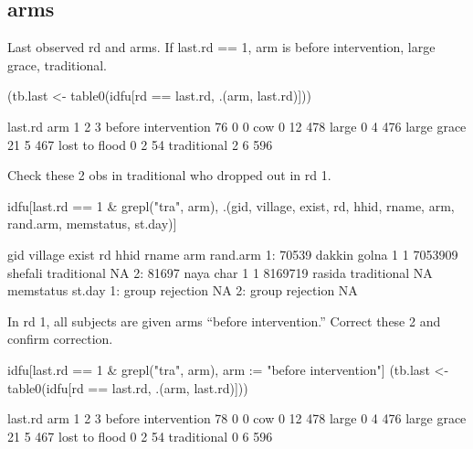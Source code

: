 \subsection{arms}



Last observed rd and arms. If \textsf{last.rd} == 1, arm is before intervention, large grace, traditional. 
\begin{Schunk}
\begin{Sinput}
(tb.last <- table0(idfu[rd == last.rd, .(arm, last.rd)]))
\end{Sinput}
\begin{Soutput}
                     last.rd
arm                     1   2   3
  before intervention  76   0   0
  cow                   0  12 478
  large                 0   4 476
  large grace          21   5 467
  lost to flood         0   2  54
  traditional           2   6 596
\end{Soutput}
\end{Schunk}
Check these 2 obs in traditional who dropped out in rd 1.
\begin{Schunk}
\begin{Sinput}
idfu[last.rd == 1 & grepl("tra", arm), 
	.(gid, village, exist, rd, hhid, rname, arm, rand.arm, memstatus, st.day)]
\end{Sinput}
\begin{Soutput}
     gid      village exist rd    hhid   rname         arm rand.arm
1: 70539 dakkin golna     1  1 7053909 shefali traditional       NA
2: 81697    naya char     1  1 8169719  rasida traditional       NA
         memstatus st.day
1: group rejection     NA
2: group rejection     NA
\end{Soutput}
\end{Schunk}
In rd 1, all subjects are given arms ``before intervention.'' Correct these 2 and confirm correction.
\begin{Schunk}
\begin{Sinput}
idfu[last.rd == 1 & grepl("tra", arm), arm := "before intervention"]
(tb.last <- table0(idfu[rd == last.rd, .(arm, last.rd)]))
\end{Sinput}
\begin{Soutput}
                     last.rd
arm                     1   2   3
  before intervention  78   0   0
  cow                   0  12 478
  large                 0   4 476
  large grace          21   5 467
  lost to flood         0   2  54
  traditional           0   6 596
\end{Soutput}
\end{Schunk}


